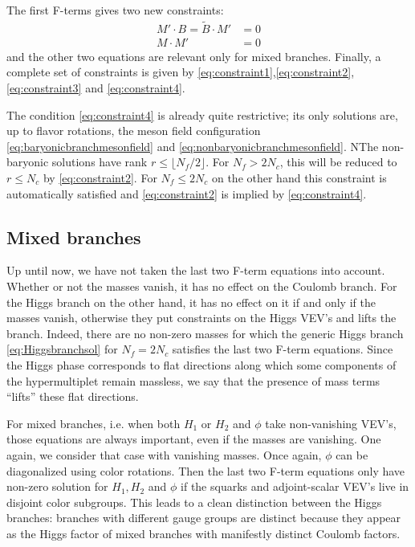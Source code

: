             The first F-terms gives two new constraints:
            \begin{align}
                M'\cdot B = \tilde{B}\cdot M' &= 0\label{eq:constraint3}\\
                M\cdot M' &= 0\label{eq:constraint4}
            \end{align} 
            and the other two equations are relevant only for mixed branches. Finally, a complete set of constraints is given by \eqref{eq:constraint1},\eqref{eq:constraint2},\eqref{eq:constraint3} and \eqref{eq:constraint4}.

            The condition \eqref{eq:constraint4} is already quite restrictive; its only solutions are, up to flavor rotations, the meson field configuration \eqref{eq:baryonicbranchmesonfield} and \eqref{eq:nonbaryonicbranchmesonfield}. NThe non-baryonic solutions have rank $r\leq\lfloor N_f/2\rfloor$. For $N_f> 2N_c$, this will be reduced to $r\leq N_c$ by \eqref{eq:constraint2}. For $N_f\leq 2N_c$ on the other hand this constraint is automatically satisfied and \eqref{eq:constraint2} is implied by \eqref{eq:constraint4}.

    \subsection{Mixed branches}

        Up until now, we have not taken the last two F-term equations into account. Whether or not the masses vanish, it has no effect on the Coulomb branch. For the Higgs branch on the other hand, it has no effect on it if and only if the masses vanish, otherwise they put constraints on the Higgs VEV's and lifts the branch. Indeed, there are no non-zero masses for which the generic Higgs branch \eqref{eq:Higgsbranchsol} for $N_f=2N_c$ satisfies the last two F-term equations. Since the Higgs phase corresponds to flat directions along which some components of the hypermultiplet remain massless, we say that the presence of mass terms ``lifts'' these flat directions.

        For mixed branches, i.e. when both $H_1$ or $H_2$ and $\phi$ take non-vanishing VEV's, those equations are always important, even if the masses are vanishing. One again, we consider that case with vanishing masses. Once again, $\phi$ can be diagonalized using color rotations. Then the last two F-term equations only have non-zero solution for $H_1,H_2$ and $\phi$ if the squarks and adjoint-scalar VEV's live in disjoint color subgroups. This leads to a clean distinction between the Higgs branches: branches with different gauge groups are distinct because they appear as the Higgs factor of mixed branches with manifestly distinct Coulomb factors.

